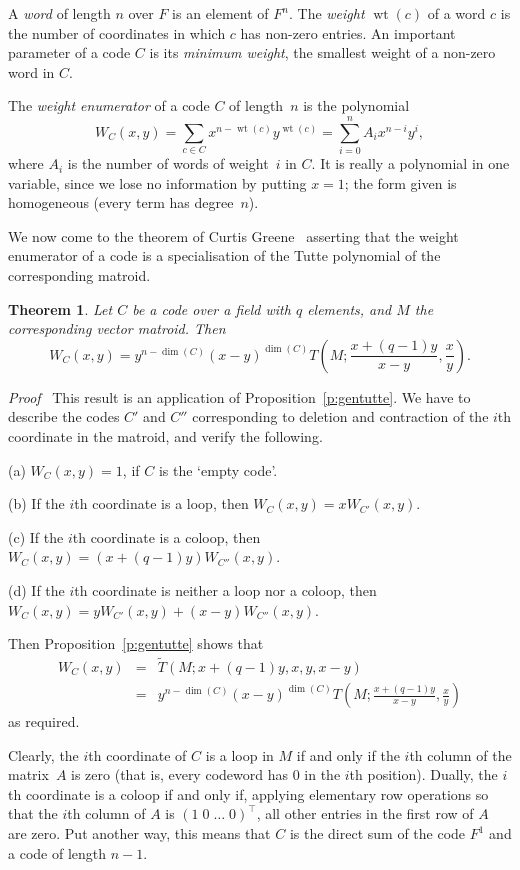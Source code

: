 \documentclass[12pt]{article}
\newtheorem{theorem}{Theorem}[section]
\newcommand{\head}[1]{\medbreak\noindent\textit{#1}\ }
\newcommand{\wt}{\mathop{\mathrm{wt}}}
\begin{document}
A \emph{word} of length $n$ over $F$ is an element of $F^n$.
The \emph{weight} $\wt(c)$ of a word $c$ is the number of
coordinates in which $c$ has non-zero entries. An important
parameter of a code $C$ is its \emph{minimum weight}, the smallest
weight of a non-zero word in $C$.

The \emph{weight enumerator} of a code $C$ of length~$n$ is the polynomial
\[W_C(x,y)=\sum_{c\in C}x^{n-\wt(c)}y^{\wt(c)}=\sum_{i=0}^nA_ix^{n-i}y^i,\]
where $A_i$ is the number of words of weight~$i$ in $C$. It is really a
polynomial in one variable, since we lose no information by putting $x=1$;
the form given is homogeneous (every term has degree~$n$).

We now come to the theorem of Curtis Greene~\cite{greene} asserting that
the weight enumerator of a code is a specialisation of the Tutte polynomial
of the corresponding matroid.

\begin{theorem}
Let $C$ be a code over a field with $q$ elements, and $M$ the corresponding
vector matroid. Then
\[W_C(x,y)=y^{n-\dim(C)}(x-y)^{\dim(C)}
T\left(M; \frac{x+(q-1)y}{x-y},\frac{x}{y}\right).\]
\label{t:greene}
\end{theorem}

\head{Proof} This result is an application of Proposition~\ref{p:gentutte}.
We have to describe the codes $C'$ and $C''$ corresponding to deletion
and contraction of the $i$th coordinate in the matroid, and verify the
following.
\begin{description}
\item{(a)} $W_C(x,y)=1$, if $C$ is the `empty code'.
\item{(b)} If the $i$th coordinate is a loop, then $W_C(x,y)=xW_{C'}(x,y)$.
\item{(c)} If the $i$th coordinate is a coloop, then $W_C(x,y)=
(x+(q-1)y)W_{C''}(x,y)$.
\item{(d)} If the $i$th coordinate is neither a loop nor a coloop, then
$W_C(x,y)=yW_{C'}(x,y)+(x-y)W_{C''}(x,y)$.
\end{description}
Then Proposition~\ref{p:gentutte} shows that
\begin{eqnarray*}
W_C(x,y)&=&\tilde T(M; x+(q-1)y,x,y,x-y)\\
&=&y^{n-\dim(C)}(x-y)^{\dim(C)}T\left(M;\frac{x+(q-1)y}{x-y},\frac{x}{y}\right)
\end{eqnarray*}
as required.

Clearly, the $i$th coordinate of $C$ is a loop in $M$ if and only if the
$i$th column of the matrix~$A$ is zero (that is, every codeword has $0$ in
the $i$th position). Dually, the $i$th coordinate is a coloop if and only if,
applying elementary row operations so that the $i$th column of $A$ is
$(1\;0\;\ldots\;0)^\top$, all other entries in the first row of $A$ are
zero. Put another way, this means that $C$ is the direct sum of the
code $F^1$ and a code of length $n-1$.
\end{document}
